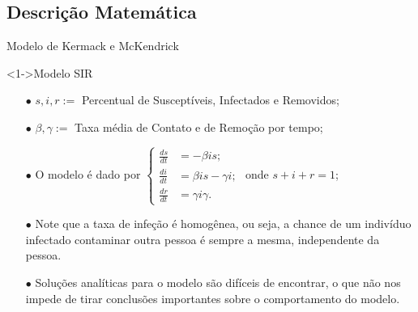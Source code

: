 \documentclass{beamer}
\theoremstyle{plain}
\theoremstyle{definition}
\begin{document}
\subsection{Descrição Matemática}
\begin{frame}{Modelo de Kermack e McKendrick}

    \begin{exampleblock}
        <1->{Modelo SIR}
        \begin{itemize}
            \item [$\bullet$] $s,i,r :=$ Percentual de Susceptíveis, Infectados e Removidos;
            \item [$\bullet$] $\beta, \gamma := $ Taxa média de Contato e de Remoção por tempo;
            \item [$\bullet$] O modelo é dado por
                $ 
                \begin{cases}
                    \frac{ds}{dt} &= -\beta i s; \\ 
                    \frac{di}{dt} &= \beta i s - \gamma i;  \\
                    \frac{dr}{dt} &= \gamma i \gamma. 
                \end{cases}
                $ 
                onde $s + i + r = 1$;
            \item [$\bullet$] Note que a taxa de infeção é homogênea, ou seja, a chance de um indivíduo
                infectado contaminar outra pessoa é sempre a mesma, independente da pessoa. 
            \item [$\bullet$] Soluções analíticas para o modelo são difíceis de encontrar, o que não 
                nos impede de tirar conclusões importantes sobre o comportamento do modelo.

        \end{itemize}

    \end{exampleblock} 
    
\end{frame}



\end{document}
